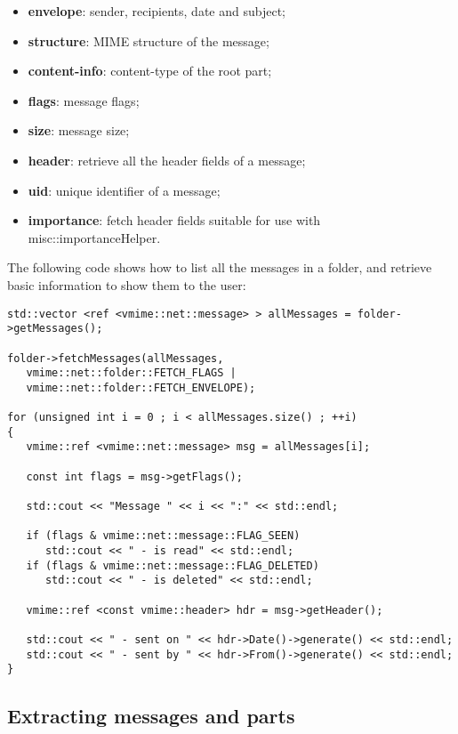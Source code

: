 \begin{itemize}
\item {\bf envelope}: sender, recipients, date and subject;
\item {\bf structure}: MIME structure of the message;
\item {\bf content-info}: content-type of the root part;
\item {\bf flags}: message flags;
\item {\bf size}: message size;
\item {\bf header}: retrieve all the header fields of a message;
\item {\bf uid}: unique identifier of a message;
\item {\bf importance}: fetch header fields suitable for use with
{\vcode misc::importanceHelper}.
\end{itemize}


The following code shows how to list all the messages in a folder, and
retrieve basic information to show them to the user:

\begin{lstlisting}[caption={Fetching information about multiple messages}]
std::vector <ref <vmime::net::message> > allMessages = folder->getMessages();

folder->fetchMessages(allMessages,
   vmime::net::folder::FETCH_FLAGS |
   vmime::net::folder::FETCH_ENVELOPE);

for (unsigned int i = 0 ; i < allMessages.size() ; ++i)
{
   vmime::ref <vmime::net::message> msg = allMessages[i];

   const int flags = msg->getFlags();

   std::cout << "Message " << i << ":" << std::endl;

   if (flags & vmime::net::message::FLAG_SEEN)
      std::cout << " - is read" << std::endl;
   if (flags & vmime::net::message::FLAG_DELETED)
      std::cout << " - is deleted" << std::endl;

   vmime::ref <const vmime::header> hdr = msg->getHeader();

   std::cout << " - sent on " << hdr->Date()->generate() << std::endl;
   std::cout << " - sent by " << hdr->From()->generate() << std::endl;
}
\end{lstlisting}

\subsection{Extracting messages and parts}


